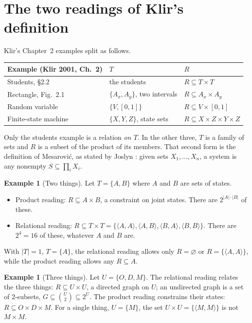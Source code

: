 \documentclass[11pt]{article}
\theoremstyle{definition}
\newtheorem{example}[theorem]{Example}
\theoremstyle{remark}
\begin{document}
\section{The two readings of Klir's definition}\label{sec:readings}

Klir's Chapter~2 examples split as follows.

\begin{center}
\begin{tabular}{@{}lll@{}}
\toprule
Example (Klir 2001, Ch.~2) & $T$ & $R$\\
\midrule
Students, \S2.2 & the students & $R\subseteq T\times T$\\
Rectangle, Fig.~2.1 & $\{A_x,A_y\}$, two intervals & $R\subseteq A_x\times A_y$\\
Random variable & $\{V,[0,1]\}$ & $R\subseteq V\times[0,1]$\\
Finite-state machine & $\{X,Y,Z\}$, state sets & $R\subseteq X\times Z\times Y\times Z$\\
\bottomrule
\end{tabular}
\end{center}

Only the students example is a relation \emph{on $T$}. In the other three, $T$ is a family of sets and $R$ is a subset of the product of its members. That second form is the definition of Mesarovi\'c, as stated by Joslyn \cite[Def.~5]{joslyn1995}: given sets $X_1,\dots,X_n$, a system is any nonempty $S\subseteq\prod_i X_i$.

\begin{example}[Two things]\label{ex:AB}
Let $T=\{A,B\}$ where $A$ and $B$ are sets of states.
\begin{itemize}[nosep]
\item Product reading: $R\subseteq A\times B$, a constraint on joint states. There are $2^{|A|\cdot|B|}$ of these.
\item Relational reading: $R\subseteq T\times T=\{\langle A,A\rangle,\langle A,B\rangle,\langle B,A\rangle,\langle B,B\rangle\}$. There are $2^4=16$ of these, whatever $A$ and $B$ are.
\end{itemize}
With $|T|=1$, $T=\{A\}$, the relational reading allows only $R=\varnothing$ or $R=\{\langle A,A\rangle\}$, while the product reading allows any $R\subseteq A$.
\end{example}

\begin{example}[Three things]\label{ex:ODM}
Let $U=\{O,D,M\}$. The relational reading relates the three things: $R\subseteq U\times U$, a directed graph on $U$; an undirected graph is a set of $2$-subsets, $G\subseteq\binom{U}{2}\subseteq 2^{U}$. The product reading constrains their states: $R\subseteq O\times D\times M$. For a single thing, $U=\{M\}$, the set $U\times U=\{\langle M,M\rangle\}$ is not $M\times M$.
\end{example}
\end{document}
